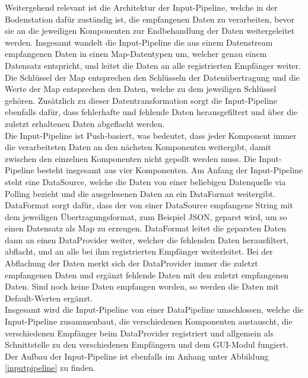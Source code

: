 Weitergehend relevant ist die Architektur der Input-Pipeline, welche in der Bodenstation dafür zuständig ist, die empfangenen Daten zu verarbeiten, bevor sie an die jeweiligen Komponenten zur Endbehandlung der Daten weitergeleitet werden. Insgesamt wandelt die Input-Pipeline die aus einem Datenstream empfangenen Daten in einen Map-Datentypen um, welcher genau einem Datensatz entspricht, und leitet die Daten an alle registrierten Empfänger weiter. Die Schlüssel der Map entsprechen den Schlüsseln der Datenübertragung und die Werte der Map entsprechen den Daten, welche zu dem jeweiligen Schlüssel gehören. Zusätzlich zu dieser Datentransformation sorgt die Input-Pipeline ebenfalls dafür, dass fehlerhafte und fehlende Daten herausgefiltert und über die zuletzt erhaltenen Daten abgeflacht werden. \\
Die Input-Pipeline ist Push-basiert, was bedeutet, dass jeder Komponent immer die verarbeiteten Daten an den nächsten Komponenten weitergibt, damit zwischen den einzelnen Komponenten nicht gepollt werden muss. Die Input-Pipeline besteht insgesamt aus vier Komponenten. Am Anfang der Input-Pipeline steht eine DataSource, welche die Daten von einer beliebigen Datenquelle via Polling bezieht und die ausgelesenen Daten an ein DataFormat weitergibt. DataFormat sorgt dafür, dass der von einer DataSource empfangene String mit dem jeweiligen Übertragungsformat, zum Beispiel JSON, geparst wird, um so einen Datensatz als Map zu erzeugen. DataFormat leitet die geparsten Daten dann an einen DataProvider weiter, welcher die fehlenden Daten herausfiltert, abflacht, und an alle bei ihm registrierten Empfänger weiterleitet. Bei der Abflachung der Daten merkt sich der DataProvider immer die zuletzt empfangenen Daten und ergänzt fehlende Daten mit den zuletzt empfangenen Daten. Sind noch keine Daten empfangen worden, so werden die Daten mit Default-Werten ergänzt. \\
Insgesamt wird die Input-Pipeline von einer DataPipeline umschlossen, welche die Input-Pipeline zusammenbaut, die verschiedenen Komponenten austauscht, die verschiedenen Empfänger beim DataProvider registriert und allgemein als Schnittstelle zu den verschiedenen Empfängern und dem GUI-Modul fungiert.
Der Aufbau der Input-Pipeline ist ebenfalls im Anhang unter Abbildung \ref{inputpipeline} zu finden.